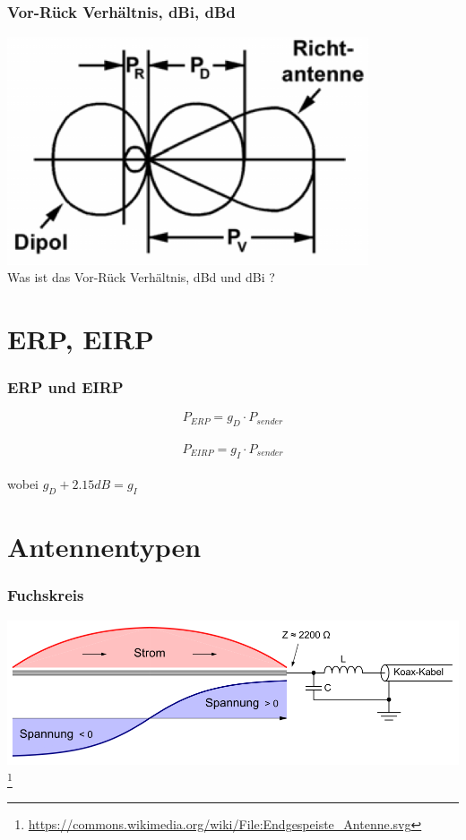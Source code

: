 \begin{frame}
  \frametitle{Vor-Rück Verhältnis, dBi, dBd}
  \begin{center}
    \includegraphics[width=0.8\textwidth]{a09/TH206.png}
    \tiny \hyperlink{refs}{\cite{bna}} \\[1em] \large Was ist das Vor-Rück Verhältnis, dBd und dBi ?
  \end{center}
\end{frame}


\section*{ERP, EIRP}

\begin{frame}
  \frametitle{ERP und EIRP}
  \begin{center}
    \Large $$P_{ERP} = g_{D} \cdot P_{sender}$$ \\
    $$P_{EIRP} = g_{I} \cdot P_{sender}$$ \\
    wobei $g_D + 2.15dB = g_I$
  \end{center}
\end{frame}

\section*{Antennentypen}

\begin{frame}
  \frametitle{Fuchskreis}
  \begin{center}
    \includegraphics[width=1\textwidth]{a09/1000px-Endgespeiste_Antenne.png}
    \footnote{\tiny \url{https://commons.wikimedia.org/wiki/File:Endgespeiste_Antenne.svg}}
  \end{center}
\end{frame}

